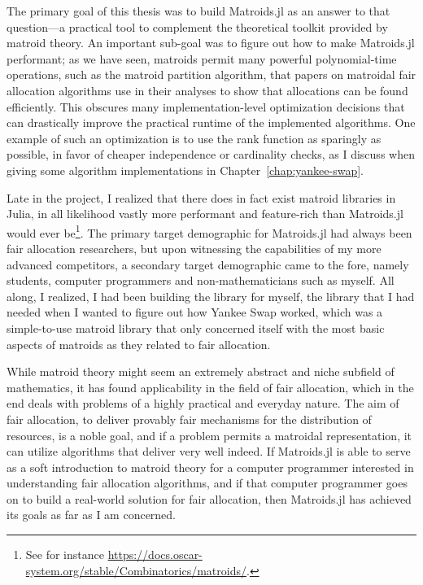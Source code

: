 The primary goal of this thesis was to build Matroids.jl as an answer to that question---a practical tool to complement the theoretical toolkit provided by matroid theory. An important sub-goal was to figure out how to make Matroids.jl performant; as we have seen, matroids permit many powerful polynomial-time operations, such as the matroid partition algorithm, that papers on matroidal fair allocation algorithms use in their analyses to show that allocations can be found efficiently. This obscures many implementation-level optimization decisions that can drastically improve the practical runtime of the implemented algorithms. One example of such an optimization is to use the rank function as sparingly as possible, in favor of cheaper independence or cardinality checks, as I discuss when giving some algorithm implementations in Chapter~\ref{chap:yankee-swap}.

Late in the project, I realized that there does in fact exist matroid libraries in Julia, in all likelihood vastly more performant and feature-rich than Matroids.jl would ever be\footnote{See for instance \href{https://docs.oscar-system.org/stable/Combinatorics/matroids/}{https://docs.oscar-system.org/stable/Combinatorics/matroids/}.}. The primary target demographic for Matroids.jl had always been fair allocation researchers, but upon witnessing the capabilities of my more advanced competitors, a secondary target demographic came to the fore, namely students, computer programmers and non-mathematicians such as myself. All along, I realized, I had been building the library for myself, the library that I had needed when I wanted to figure out how Yankee Swap worked, which was a simple-to-use matroid library that only concerned itself with the most basic aspects of matroids as they related to fair  allocation.

While matroid theory might seem an extremely abstract and niche subfield of mathematics, it has found applicability in the field of fair allocation, which in the end deals with problems of a highly practical and everyday nature. The aim of fair allocation, to deliver provably fair mechanisms for the distribution of resources, is a noble goal, and if a problem permits a matroidal representation, it can utilize algorithms that deliver very well indeed. If Matroids.jl is able to serve as a soft introduction to matroid theory for a computer programmer interested in understanding fair allocation algorithms, and if that computer programmer goes on to build a real-world solution for fair allocation, then Matroids.jl has achieved its goals as far as I am concerned.
